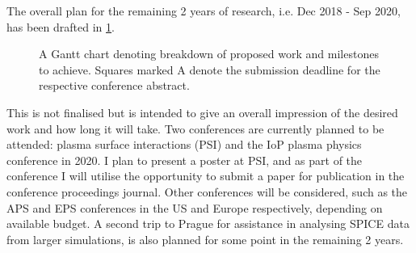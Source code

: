 \documentclass[a4paper, 12pt]{article} %
\begin{document}


	The overall plan for the remaining 2 years of research, i.e. Dec 2018 - Sep 2020, has been drafted in \cref{fig:timeline}.
	\begin{figure}[t]
		\vspace{-0pt}
		\caption{A Gantt chart denoting breakdown of proposed work and milestones to achieve. Squares marked A denote the submission deadline for the respective conference abstract.}
		\label{fig:timeline} 
	\end{figure}
	This is not finalised but is intended to give an overall impression of the desired work and how long it will take. 
	Two conferences are currently planned to be attended: plasma surface interactions (PSI) and the IoP plasma physics conference in 2020.
	I plan to present a poster at PSI, and as part of the conference I will utilise the opportunity to submit a paper for publication in the conference proceedings journal.
	Other conferences will be considered, such as the APS and EPS conferences in the US and Europe respectively, depending on available budget.
	A second trip to Prague for assistance in analysing SPICE data from larger simulations, is also planned for some point in the remaining 2 years. 



\begingroup
{}
\setlength\bibitemsep{3.5pt}
\printbibliography
\endgroup
%
%

\end{document}
